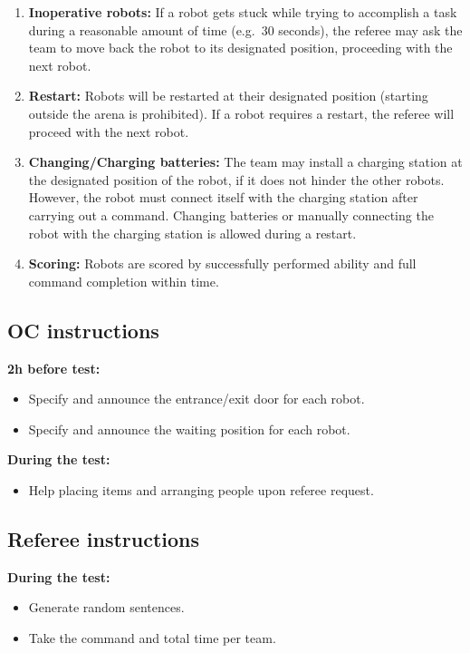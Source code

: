 \begin{enumerate}
	\item \textbf{Inoperative robots:} If a robot gets stuck while trying to accomplish a task during a reasonable amount of time (e.g.~30 seconds), the referee may ask the team to move back the robot to its designated position, proceeding with the next robot. \\

	\item \textbf{Restart:} Robots will be restarted at their designated position (starting outside the arena is prohibited). If a robot requires a restart, the referee will proceed with the next robot.\\

	\item \textbf{Changing/Charging batteries:} The team may install a charging station at the designated position of the robot, if it does not hinder the other robots. However, the robot must connect itself with the charging station after carrying out a command. Changing batteries or manually connecting the robot with the charging station is allowed during a restart. \\

	\item \textbf{Scoring:} Robots are scored by successfully performed ability and full command completion within time. 
\end{enumerate}

\subsection{OC instructions}
\textbf{2h before test:}
\begin{itemize}
	\item Specify and announce the entrance/exit door for each robot. 
	\item Specify and announce the waiting position for each robot. 
\end{itemize}
\textbf{During the test:}
\begin{itemize}
	\item Help placing items and arranging people upon referee request.
\end{itemize}

\subsection{Referee instructions}
\textbf{During the test:}
\begin{itemize}
	\item Generate random sentences. %
	\item Take the command and total time per team.
\end{itemize}

